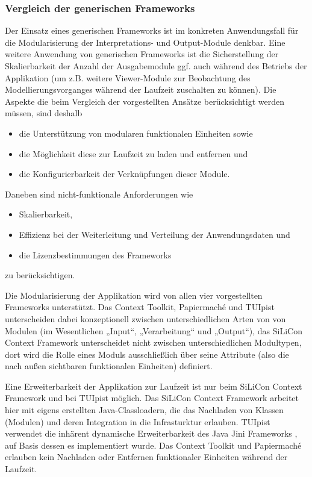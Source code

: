 
\subsubsection{Vergleich der generischen Frameworks}\label{subs:vergleich_generische_frameworks}

Der Einsatz eines generischen Frameworks ist im konkreten Anwendungsfall für die Modularisierung der Interpretations- und Output-Module denkbar. Eine weitere Anwendung von generischen Frameworks ist die Sicherstellung der Skalierbarkeit der Anzahl der Ausgabemodule ggf. auch während des Betriebs der Applikation (um z.B. weitere Viewer-Module zur Beobachtung des Modellierungsvorganges während der Laufzeit zuschalten zu können). Die Aspekte die beim Vergleich der vorgestellten Ansätze berücksichtigt werden müssen, sind deshalb
\begin{itemize}
  	\item die Unterstützung von modularen funktionalen Einheiten sowie
	\item die Möglichkeit diese zur Laufzeit zu laden und entfernen und
	\item die Konfigurierbarkeit der Verknüpfungen dieser Module.
\end{itemize}  
Daneben sind nicht-funktionale Anforderungen wie 
\begin{itemize}
	\item Skalierbarkeit,
	\item Effizienz bei der Weiterleitung und Verteilung der Anwendungsdaten und  
	\item die Lizenzbestimmungen des Frameworks
\end{itemize}  
zu berücksichtigen.

Die Modularisierung der Applikation wird von allen vier vorgestellten Frameworks unterstützt. Das Context Toolkit, Papiermaché und TUIpist unterscheiden dabei konzeptionell zwischen unterschiedlichen Arten von von Modulen (im Wesentlichen „Input“, „Verarbeitung“ und „Output“), das SiLiCon Context Framework unterscheidet nicht zwischen unterschiedlichen Modultypen, dort wird die Rolle eines Moduls ausschließlich über seine Attribute (also die nach außen sichtbaren funktionalen Einheiten) definiert. 

Eine Erweiterbarkeit der Applikation zur Laufzeit ist nur beim SiLiCon Context Framework und bei TUIpist möglich. Das SiLiCon Context Framework arbeitet hier mit eigens erstellten Java-Classloadern, die das Nachladen von Klassen (Modulen) und deren Integration in die Infrasturktur erlauben. TUIpist verwendet die inhärent dynamische Erweiterbarkeit des Java Jini Frameworks \citep{Arnold99}, auf Basis dessen es implementiert wurde. Das Context Toolkit und Papiermaché erlauben kein Nachladen oder Entfernen funktionaler Einheiten während der Laufzeit.

